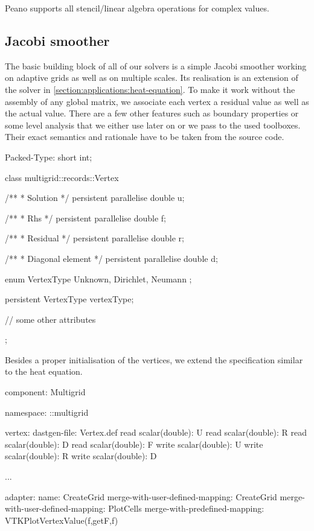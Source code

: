 \begin{remark}
  Peano supports all stencil/linear algebra operations for complex values.
\end{remark}


\subsection{Jacobi smoother}

The basic building block of all of our solvers is a simple Jacobi smoother
working on adaptive grids as well as on multiple scales.
Its realisation is an extension of the solver in \ref{section:applications:heat-equation}.
To make it work without the assembly of any global matrix, we associate each
vertex a residual value as well as the actual value. 
There are a few other features such as boundary properties or some level
analysis that we either use later on or we pass to the used toolboxes. 
Their exact semantics and rationale have to be taken from the source code.

\begin{code}
Packed-Type: short int;


class multigrid::records::Vertex {  
  /**
   * Solution
   */
  persistent parallelise double  u;

  /**
   * Rhs
   */
  persistent parallelise double  f;
  
  /**
   * Residual
   */
  persistent parallelise double   r;

  /**
   * Diagonal element
   */
  persistent parallelise double   d;
  
  enum VertexType {
    Unknown, Dirichlet, Neumann
  };
  
  persistent VertexType vertexType;
  
  // some other attributes
};
\end{code}

\noindent
Besides a proper initialisation of the vertices, we extend the specification
similar to the heat equation.
\begin{code}
component: Multigrid

namespace: ::multigrid

vertex:
  dastgen-file: Vertex.def
  read scalar(double): U
  read scalar(double): R
  read scalar(double): D
  read scalar(double): F
  write scalar(double): U
  write scalar(double): R
  write scalar(double): D
  
...

adapter:
  name: CreateGrid
  merge-with-user-defined-mapping: CreateGrid
  merge-with-user-defined-mapping: PlotCells
  merge-with-predefined-mapping: VTKPlotVertexValue(f,getF,f)
\end{code}

